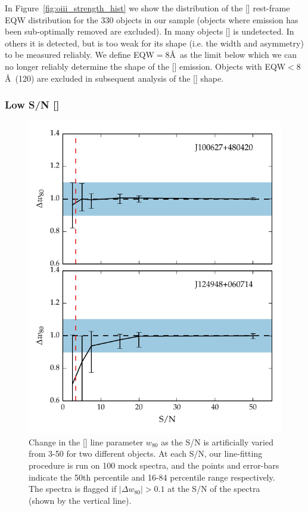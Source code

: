 In Figure~\ref{fig:oiii_strength_hist} we show the distribution of the [] rest-frame \ac{EQW} distribution for the 330 objects in our sample (objects where  emission has been sub-optimally removed are excluded). 
In many objects [] is undetected. 
In others it is detected, but is too weak for its shape (i.e. the width and asymmetry) to be measured reliably. 
We define \ac{EQW}$=8$\AA\, as the limit below which we can no longer reliably determine the shape of the [] emission. 
Objects with \ac{EQW}$<8$\AA\, (120) are excluded in subsequent analysis of the [] shape.  

\subsubsection{Low \ac{S/N} []}
 
\begin{figure}
    \centering
    \includegraphics[width=0.7\columnwidth]{figures/chapter04/snr_test.pdf} 
    \caption{Change in the [] line parameter $w_{80}$ as the \ac{S/N} is artificially varied from 3-50 for two different objects. At each \ac{S/N}, our line-fitting procedure is run on 100 mock spectra, and the points and error-bars indicate the 50th percentile and 16-84 percentile range respectively. The spectra is flagged if $|\Delta w_{80}|>0.1$ at the \ac{S/N} of the spectra (shown by the vertical line).}
    \label{fig:snr_test}
\end{figure}

